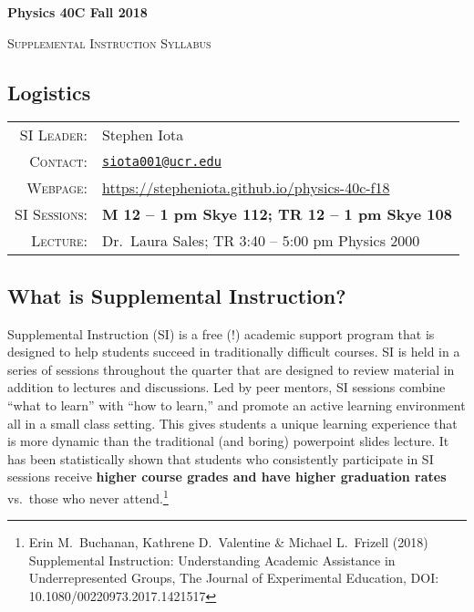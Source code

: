 \documentclass[11pt]{article}
\begin{document}
\begin{center}
\huge\textbf{{Physics 40C Fall 2018}}

\Large{\textsc{Supplemental Instruction Syllabus}} 


\end{center}





\subsection*{Logistics}

\begin{tabular}{rl}

\textsc{SI Leader}:
&
Stephen Iota
\\
\textsc{Contact}:
&
\href{mailto:siota001@ucr.edu}{\texttt{siota001@ucr.edu}}
\\
\textsc{Webpage}:
&
\url{https://stepheniota.github.io/physics-40c-f18}
\\
\textsc{SI Sessions}:
&
\textbf{M 12 -- 1 pm Skye 112; TR 12 -- 1 pm Skye 108}
\\
\textsc{Lecture:}
&
Dr.~Laura Sales; TR 3:40 -- 5:00 pm Physics 2000
\\
\end{tabular}







\subsection*{What is Supplemental Instruction?}

Supplemental Instruction \textsc{(SI)} is a free (!) academic support program that is designed to help students succeed in traditionally difficult courses. 
SI is held in a series of sessions throughout the quarter that are designed to review material in addition to lectures and discussions. 
Led by peer mentors, SI sessions combine ``what to learn'' with ``how to learn,''  and promote an active learning environment all in a small class setting.  
This gives students a unique learning experience that is more dynamic than the traditional (and boring) powerpoint slides lecture. 
It has been statistically shown that students who consistently participate in SI sessions receive \textbf{higher course grades and have higher graduation rates} vs.~those who never attend.\footnote{Erin M.~Buchanan, Kathrene D.~Valentine \& Michael L.~Frizell (2018) Supplemental Instruction: Understanding Academic Assistance in Underrepresented Groups, The Journal of Experimental Education, DOI: 10.1080/00220973.2017.1421517}
\end{document}
